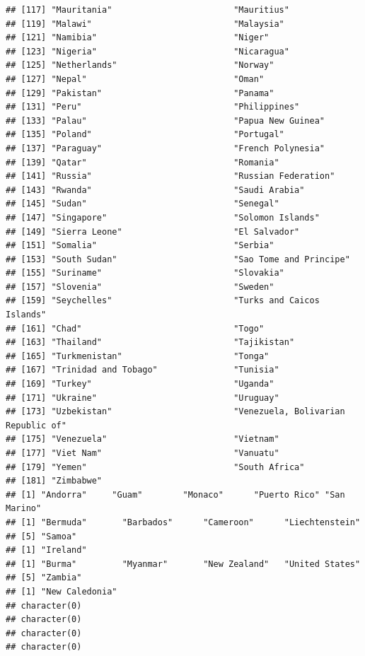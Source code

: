 \documentclass[]{article}
\begin{document}
\begin{verbatim}
## [117] "Mauritania"                        "Mauritius"                        
## [119] "Malawi"                            "Malaysia"                         
## [121] "Namibia"                           "Niger"                            
## [123] "Nigeria"                           "Nicaragua"                        
## [125] "Netherlands"                       "Norway"                           
## [127] "Nepal"                             "Oman"                             
## [129] "Pakistan"                          "Panama"                           
## [131] "Peru"                              "Philippines"                      
## [133] "Palau"                             "Papua New Guinea"                 
## [135] "Poland"                            "Portugal"                         
## [137] "Paraguay"                          "French Polynesia"                 
## [139] "Qatar"                             "Romania"                          
## [141] "Russia"                            "Russian Federation"               
## [143] "Rwanda"                            "Saudi Arabia"                     
## [145] "Sudan"                             "Senegal"                          
## [147] "Singapore"                         "Solomon Islands"                  
## [149] "Sierra Leone"                      "El Salvador"                      
## [151] "Somalia"                           "Serbia"                           
## [153] "South Sudan"                       "Sao Tome and Principe"            
## [155] "Suriname"                          "Slovakia"                         
## [157] "Slovenia"                          "Sweden"                           
## [159] "Seychelles"                        "Turks and Caicos Islands"         
## [161] "Chad"                              "Togo"                             
## [163] "Thailand"                          "Tajikistan"                       
## [165] "Turkmenistan"                      "Tonga"                            
## [167] "Trinidad and Tobago"               "Tunisia"                          
## [169] "Turkey"                            "Uganda"                           
## [171] "Ukraine"                           "Uruguay"                          
## [173] "Uzbekistan"                        "Venezuela, Bolivarian Republic of"
## [175] "Venezuela"                         "Vietnam"                          
## [177] "Viet Nam"                          "Vanuatu"                          
## [179] "Yemen"                             "South Africa"                     
## [181] "Zimbabwe"                         
## [1] "Andorra"     "Guam"        "Monaco"      "Puerto Rico" "San Marino" 
## [1] "Bermuda"       "Barbados"      "Cameroon"      "Liechtenstein"
## [5] "Samoa"        
## [1] "Ireland"
## [1] "Burma"         "Myanmar"       "New Zealand"   "United States"
## [5] "Zambia"       
## [1] "New Caledonia"
## character(0)
## character(0)
## character(0)
## character(0)
\end{verbatim}
\end{document}

